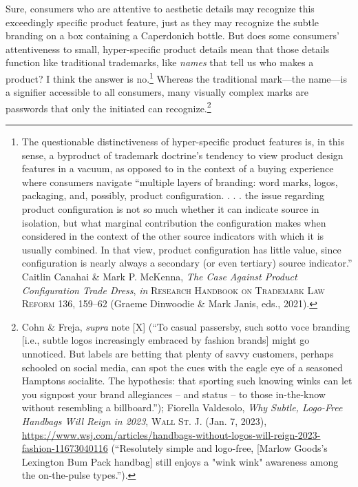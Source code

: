 \documentclass[letterpaper, 11pt, oneside]{article}
\begin{document}
\noindent Sure, consumers who are attentive to aesthetic details may recognize this exceedingly specific product feature, just as they may recognize the subtle branding on a box containing a Caperdonich bottle. But does some consumers' attentiveness to small, hyper-specific product details mean that those details function like traditional trademarks, like \textit{names} that tell us who makes a product? I think the answer is no.\footnote{The questionable distinctiveness of hyper-specific product features is, in this sense, a byproduct of trademark doctrine's tendency to view product design features in a vacuum, as opposed to in the context of a buying experience where consumers navigate ``multiple layers of branding: word marks, logos, packaging, and, possibly, product configuration. . . . the issue regarding product configuration is not so much whether it can indicate source in isolation, but what marginal contribution the configuration makes when considered in the context of the other source indicators with which it is usually combined. In that view, product configuration has little value, since configuration is nearly always a secondary (or even tertiary) source indicator.'' Caitlin Canahai \& Mark P. McKenna, \textit{The Case Against Product Configuration Trade Dress}, \textit{in} \textsc{Research Handbook on Trademark Law Reform} 136, 159–62 (Graeme Dinwoodie \& Mark Janis, eds., 2021).} Whereas the traditional mark—the name—is a signifier accessible to all consumers, many visually complex marks are passwords that only the initiated can recognize.\footnote{Cohn \& Freja, \textit{supra} note [X] (``To casual passersby, such sotto voce branding [i.e., subtle logos increasingly embraced by fashion brands] might go unnoticed. But labels are betting that plenty of savvy customers, perhaps schooled on social media, can spot the cues with the eagle eye of a seasoned Hamptons socialite. The hypothesis: that sporting such knowing winks can let you signpost your brand allegiances -- and status -- to those in-the-know without resembling a billboard.''); Fiorella Valdesolo, \textit{Why Subtle, Logo-Free Handbags Will Reign in 2023}, \textsc{Wall St. J.} (Jan. 7, 2023), \url{https://www.wsj.com/articles/handbags-without-logos-will-reign-2023-fashion-11673040116} (``Resolutely simple and logo-free, [Marlow Goods's Lexington Bum Pack handbag] still enjoys a "wink wink" awareness among the on-the-pulse types.'').}
\end{document}
